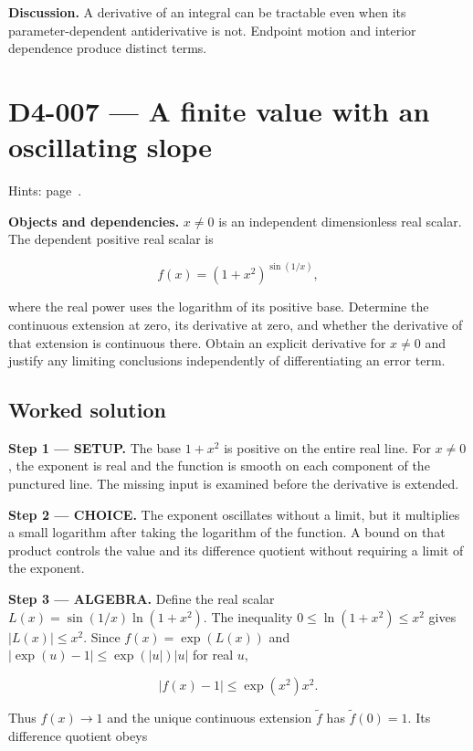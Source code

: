 \documentclass[11pt,oneside,openany]{book}
\begin{document}
\textbf{Discussion.} A derivative of an integral can be tractable even when its parameter-dependent antiderivative is not. Endpoint motion and interior dependence produce distinct terms.
\clearpage
\section{D4-007 --- A finite value with an oscillating slope}
\label{problem:D4-007}
{\small Hints: page~\pageref{hints:D4-007}.}\par\medskip

\textbf{Objects and dependencies.} \(x\ne0\) is an independent dimensionless real scalar. The dependent positive real scalar is

\[
f(x)=(1+x^2)^{\sin(1/x)},
\]

where the real power uses the logarithm of its positive base. Determine the continuous extension at zero, its derivative at zero, and whether the derivative of that extension is continuous there. Obtain an explicit derivative for \(x\ne0\) and justify any limiting conclusions independently of differentiating an error term.
\subsection*{Worked solution}

\textbf{Step 1 --- SETUP.} The base \(1+x^2\) is positive on the entire real line. For \(x\ne0\), the exponent is real and the function is smooth on each component of the punctured line. The missing input is examined before the derivative is extended.

\begin{ChoiceStep}
\textbf{Step 2 --- CHOICE.} The exponent oscillates without a limit, but it multiplies a small logarithm after taking the logarithm of the function. A bound on that product controls the value and its difference quotient without requiring a limit of the exponent.

\end{ChoiceStep}
\begingroup\color{AlgebraBlue}
\textbf{Step 3 --- ALGEBRA.} Define the real scalar \(L(x)=\sin(1/x)\ln(1+x^2)\). The inequality \(0\le\ln(1+x^2)\le x^2\) gives \(|L(x)|\le x^2\). Since \(f(x)=\exp(L(x))\) and \(|\exp(u)-1|\le\exp(|u|)|u|\) for real \(u\),

\[
|f(x)-1|\le\exp(x^2)x^2.
\]

Thus \(f(x)\to1\) and the unique continuous extension \(\widetilde f\) has \(\widetilde f(0)=1\). Its difference quotient obeys
\end{document}
